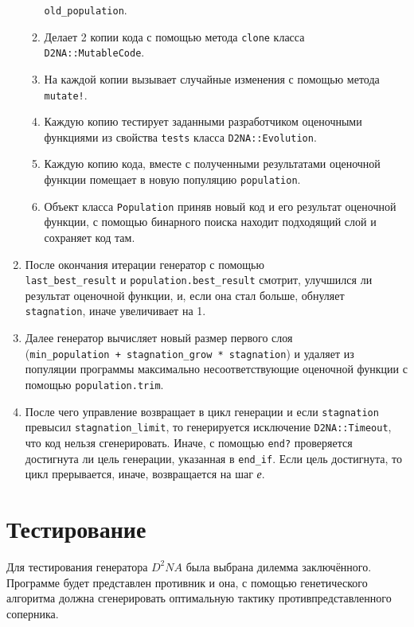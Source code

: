 \documentclass[utf8,a5paper,portrait,10pt,twoside]{eskdtext}
\begin{document}
\begin{enumerate}
\begin{enumerate}
                \texttt{old\_population}.
          \item Делает 2 копии кода с помощью метода \texttt{clone} класса
                \texttt{D2NA::MutableCode}.
          \item На каждой копии вызывает случайные изменения с помощью метода
                \texttt{mutate!}.
          \item Каждую копию тестирует заданными разработчиком оценочными
                функциями из свойства \texttt{tests} класса
                \texttt{D2NA::Evolution}.
          \item Каждую копию кода, вместе с полученными результатами оценочной
                функции помещает в новую популяцию \texttt{population}.
          \item Объект класса \texttt{Population} приняв новый код и его
                результат оценочной функции, с помощью бинарного поиска находит
                подходящий слой и сохраняет код там.
        \end{enumerate}
  \item После окончания итерации генератор с помощью\\
        \texttt{last\_best\_result} и \texttt{population.best\_result} смотрит,
        улучшился ли результат оценочной функции, и, если она стал больше,
        обнуляет \texttt{stagnation}, иначе увеличивает на 1.
  \item Далее генератор вычисляет новый размер первого слоя\\
        (\texttt{min\_population + stagnation\_grow * stagnation}) и удаляет из
        популяции программы максимально несоответствующие оценочной функции с
        помощью \texttt{population.trim}.
  \item После чего управление возвращает в цикл генерации и если
        \texttt{stagnation} превысил \texttt{stagnation\_limit}, то генерируется
        исключение \texttt{D2NA::Timeout}, что код нельзя сгенерировать.
        Иначе, с помощью \texttt{end?} проверяется достигнута ли цель генерации,
        указанная в \texttt{end\_if}. Если цель достигнута, то цикл прерывается,
        иначе, возвращается на шаг \textit{е}.
\end{enumerate}

\newpage
\section{Тестирование}

Для тестирования генератора $D^2NA$ была выбрана дилемма заключённого. Программе
будет представлен противник и она, с помощью генетического алгоритма должна
сгенерировать оптимальную тактику противпредставленного соперника.
\end{document}
